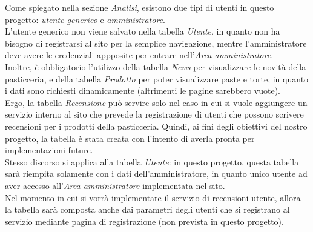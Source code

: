 Come spiegato nella sezione \emph{Analisi}, esistono due tipi di utenti in questo progetto: \emph{utente generico} e \emph{amministratore}.\\ L'utente generico non viene salvato nella tabella \emph{Utente}, in quanto non ha bisogno di registrarsi al sito per la semplice navigazione, mentre l'amministratore deve avere le credenziali appposite per entrare nell'\emph{Area amministratore}.\\
Inoltre, è obbligatorio l'utilizzo della tabella \emph{News} per visualizzare le novità della pasticceria, e della tabella \emph{Prodotto} per poter visualizzare paste e torte, in quanto i dati sono richiesti dinamicamente (altrimenti le pagine sarebbero vuote).\\
Ergo, la tabella \emph{Recensione} può servire solo nel caso in cui si vuole aggiungere un servizio interno al sito che prevede la registrazione di utenti che possono scrivere recensioni per i prodotti della pasticceria. Quindi, ai fini degli obiettivi del nostro progetto, la tabella è stata creata con l'intento di averla pronta per implementazioni future.\\
Stesso discorso si applica alla tabella \emph{Utente}: in questo progetto, questa tabella sarà riempita solamente con i dati dell'amministratore, in quanto unico utente ad aver accesso all'\emph{Area amministratore} implementata nel sito.\\
Nel momento in cui si vorrà implementare il servizio di recensioni utente, allora la tabella sarà composta anche dai parametri degli utenti che si registrano al servizio mediante pagina di registrazione (non prevista in questo progetto).
